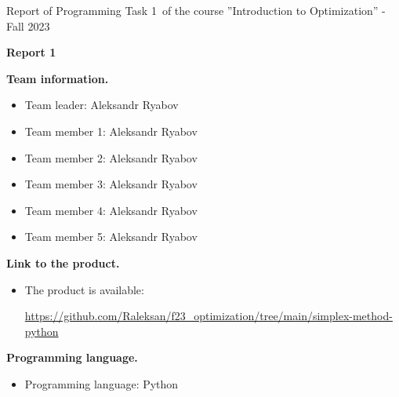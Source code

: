 \documentclass[12pt, legalpaper]{exam}
\newcommand{\course}{Introduction to Optimization}
\newcommand{\term}{Fall 2023}
\newcommand{\examnum}{Report of Programming Task 1}
\begin{document}
\noindent \examnum \, of the  course ''\course'' - \term


\noindent
{}




\vspace{12pt}
\begin{center}
    \textbf{Report 1}
\end{center}

\vspace{12pt}

\noindent  \textbf{Team information.}

\begin{itemize}
    \item Team leader: Aleksandr Ryabov
    \item Team member 1: Aleksandr Ryabov
    \item Team member 2: Aleksandr Ryabov
    \item Team member 3: Aleksandr Ryabov
    \item Team member 4: Aleksandr Ryabov
    \item Team member 5: Aleksandr Ryabov
\end{itemize}
\vspace{12pt}
\noindent     \textbf{Link to the product.}
\begin{itemize}
    \item The product is available: 
    
    \url{https://github.com/Raleksan/f23_optimization/tree/main/simplex-method-python}
\end{itemize}

\vspace{12pt}

\noindent  \textbf{Programming language.}
\begin{itemize}
    \item Programming language: Python
\end{itemize}

\vspace{12pt}
\end{document}
